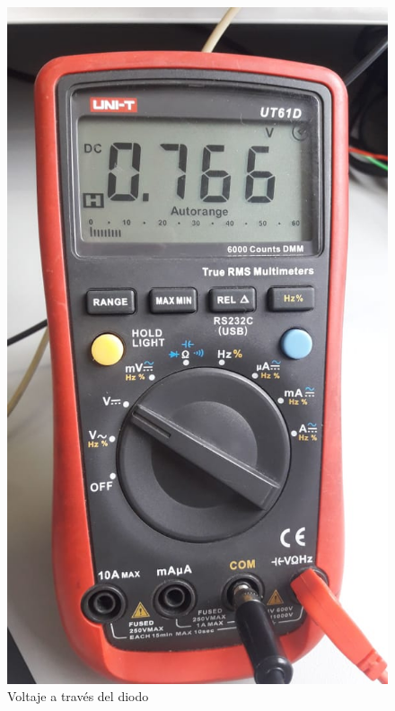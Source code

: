 \begin{figure}[H]
\centering
\begin{minipage}[c]{0.4\linewidth}
\centering
    \includegraphics[scale=0.22]{Imagenes/7Resultados/Vdiodo.jpeg}
    \caption{Voltaje a través del diodo}
    \label{fig:figura1}
\end{minipage}
\hspace{0.25cm}
\begin{minipage}[c]{0.4\linewidth}
\centering

\end{minipage}
\end{figure}
